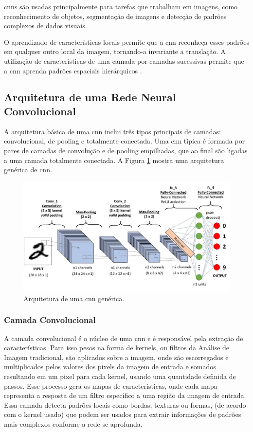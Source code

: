 \acrshort{cnn}s são usadas principalmente para tarefas que trabalham em imagens, como reconhecimento de objetos, segmentação de imagens e detecção de padrões complexos de dados visuais.

O aprendizado de características locais permite que a \acrshort{cnn} reconheça esses padrões em qualquer outro local da imagem,  tornando-a invariante a translação. A utilização de características de uma camada por camadas sucessivas permite que a \acrshort{cnn} aprenda padrões espaciais hierárquicos \cite{book:Chollet}.

\subsection{Arquitetura de uma Rede Neural Convolucional}

A arquitetura básica de uma \acrshort{cnn} inclui três tipos principais de camadas: convolucional, de pooling e totalmente conectada. 
Uma \acrshort{cnn} típica é formada por pares de camadas de convolução e de pooling empilhadas, que ao final são ligadas a uma camada totalmente conectada.
A Figura \ref{fig:cnn_arch} mostra uma arquitetura genérica de \acrshort{cnn}. 

\begin{figure}[htb]
\centerline{\includegraphics[width=1\linewidth]{images/cnn_placeholder.jpg}}
\caption{Arquitetura de uma \acrshort{cnn} genérica.}
\label{fig:cnn_arch}
\end{figure}

\subsubsection{Camada Convolucional}

A camada convolucional é o núcleo de uma \acrshort{cnn} e é responsável pela extração de características. 
Para isso pesos na forma de kernels, ou filtros da Análise de Imagem tradicional, 
são aplicados sobre a imagem, onde são escorregados e multiplicados pelos valores dos pixels da imagem de entrada e somados resultando em um pixel para cada kernel, 
usando uma quantidade definida de passos. Esse processo gera os mapas de características, onde cada mapa representa a resposta de um filtro específico a uma região da imagem de entrada. 
Essa camada detecta padrões locais como bordas, texturas ou formas, (de acordo com o kernel usado) que podem ser usados para extrair informações de padrões mais complexos conforme a rede se aprofunda.

